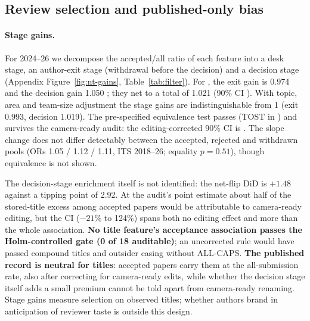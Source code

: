 \subsection{Review selection and published-only bias}
\label{sec:nt-review}

\paragraph{Stage gains.}
For 2024--26 we decompose the accepted/all ratio of each feature into a desk stage, an author-exit stage (withdrawal before the decision) and a decision stage (Appendix Figure~\ref{fig:nt-gains}, Table~\ref{tab:filter}). For \NAME{}, the exit gain is 0.974  and the decision gain 1.050 ; they net to a total of 1.021 (90\% CI ). With topic, area and team-size adjustment the stage gains are indistinguishable from 1 (exit 0.993, decision 1.019). The pre-specified equivalence test passes (TOST in ) and survives the camera-ready audit: the editing-corrected 90\% CI is . The slope change does not differ detectably between the accepted, rejected and withdrawn pools (ORs 1.05 / 1.12 / 1.11, ITS 2018--26; equality $p=0.51$), though equivalence is not shown.

The decision-stage enrichment itself is not identified: the \NAME{} net-flip DiD is $+1.48$\pp{}  against a tipping point of 2.92\pp. At the audit's point estimate about half of the stored-title \NAME{} excess among accepted papers would be attributable to camera-ready editing, but the CI ($-21\%$ to 124\%) spans both no editing effect and more than the whole association. \textbf{No title feature's acceptance association passes the Holm-controlled gate (0 of 18 auditable)}; an uncorrected rule would have passed compound titles and outsider casing without ALL-CAPS. \textbf{The published record is neutral for \NAME{} titles}: accepted papers carry them at the all-submission rate, also after correcting for camera-ready edits, while whether the decision stage itself adds a small premium cannot be told apart from camera-ready renaming. Stage gains measure selection on observed titles; whether authors brand in anticipation of reviewer taste is outside this design.


